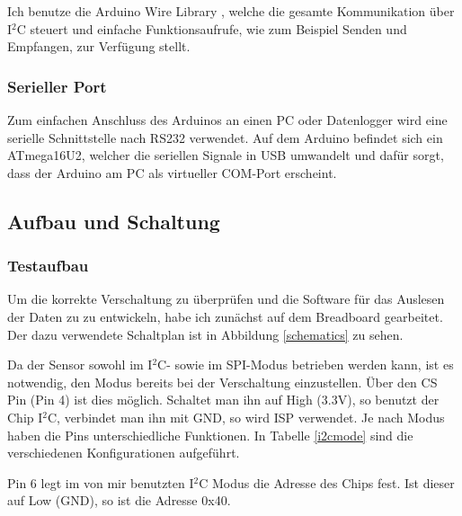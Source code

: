 \documentclass[12pt,a4paper]{scrartcl}
\begin{document}
Ich benutze die Arduino Wire Library \citep{:2012vn}, welche die gesamte Kommunikation über I$^2$C steuert und einfache Funktionsaufrufe, wie zum Beispiel Senden und Empfangen, zur Verfügung stellt.

\subsubsection{Serieller Port}
Zum einfachen Anschluss des Arduinos an einen PC oder Datenlogger wird eine serielle Schnittstelle nach RS232 verwendet. Auf dem Arduino befindet sich ein ATmega16U2, welcher die seriellen Signale in USB umwandelt und dafür sorgt, dass der Arduino am PC als virtueller COM-Port erscheint.

\newpage
\subsection{Aufbau und Schaltung}

\subsubsection{Testaufbau}

Um die korrekte Verschaltung zu überprüfen und die Software für das Auslesen der Daten zu zu entwickeln, habe ich zunächst auf dem Breadboard gearbeitet. Der dazu verwendete Schaltplan ist in Abbildung \ref{schematics} zu sehen.

Da der Sensor sowohl im I$^2$C- sowie im SPI-Modus betrieben werden kann, ist es notwendig, den Modus bereits bei der Verschaltung einzustellen. Über den CS Pin (Pin 4) ist dies möglich. Schaltet man ihn auf High (3.3V), so benutzt der Chip I$^2$C, verbindet man ihn mit GND, so wird ISP verwendet. Je nach Modus haben die Pins unterschiedliche Funktionen. In Tabelle \ref{i2cmode} sind die verschiedenen Konfigurationen aufgeführt.

Pin 6 legt im von mir benutzten I$^2$C Modus die Adresse des Chips fest. Ist dieser auf Low (GND), so ist die Adresse 0x40.
\end{document}
